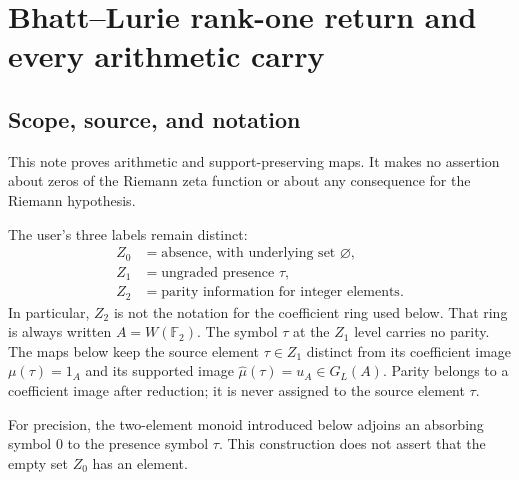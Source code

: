 \begingroup
\providecommand{\FF}{\mathbb F}
\providecommand{\ZZ}{\mathbb Z}
\providecommand{\WW}{W(\FF_2)}
\providecommand{\GL}{G_L}
\providecommand{\rk}{\mathrm{rk}}
\providecommand{\prism}{\mathrm{Prism}}
\providecommand{\botL}{\bot}
\providecommand{\topL}{\top}
\section{Bhatt--Lurie rank-one return and every arithmetic carry}
\label{sec:BLR}
\renewcommand{\theequation}{BLR\arabic{equation}}
\setcounter{equation}{0}



\subsection{Scope, source, and notation}
This note proves arithmetic and support-preserving maps. It makes no
assertion about zeros of the Riemann zeta function or about any consequence
for the Riemann hypothesis.

The user's three labels remain distinct:
\[
\begin{aligned}
 Z_0&=\text{absence, with underlying set }\varnothing,\\
 Z_1&=\text{ungraded presence }\tau,\\
 Z_2&=\text{parity information for integer elements}.
\end{aligned}
\]
In particular, $Z_2$ is not the notation for the coefficient ring used
below. That ring is always written $A=\WW$. The symbol $\tau$ at the
$Z_1$ level carries no parity. The maps below keep the source element
$\tau\in Z_1$ distinct from its coefficient image $\mu(\tau)=1_A$
and its supported image $\widehat\mu(\tau)=u_A\in\GL(A)$.
Parity belongs to a coefficient image after reduction; it is never
assigned to the source element $\tau$.

For precision, the two-element monoid introduced below adjoins an
absorbing symbol $0$ to the presence symbol $\tau$. This construction does
not assert that the empty set $Z_0$ has an element.

